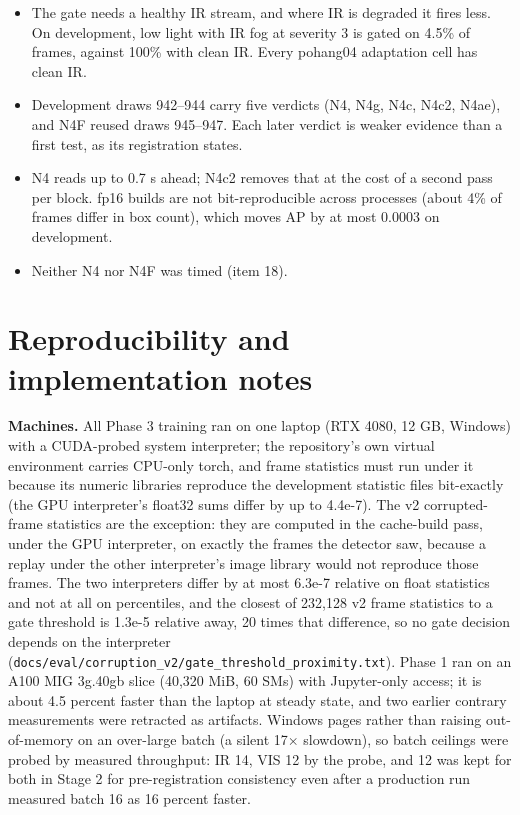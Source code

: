 \documentclass[10pt]{article}
\begin{document}
\begin{enumerate}
\begin{itemize}
\item The gate needs a healthy IR stream, and where IR is degraded it fires less. On development, low light with IR fog at severity 3 is gated on 4.5\% of frames, against 100\% with clean IR. Every pohang04 adaptation cell has clean IR.
\item Development draws 942--944 carry five verdicts (N4, N4g, N4c, N4c2, N4ae), and N4F reused draws 945--947. Each later verdict is weaker evidence than a first test, as its registration states.
\item N4 reads up to 0.7 s ahead; N4c2 removes that at the cost of a second pass per block. fp16 builds are not bit-reproducible across processes (about 4\% of frames differ in box count), which moves AP by at most 0.0003 on development.
\item Neither N4 nor N4F was timed (item 18).
\end{itemize}
\end{enumerate}

\FloatBarrier
\section{Reproducibility and implementation notes}\label{app:M}
\textbf{Machines.} All Phase 3 training ran on one laptop (RTX 4080, 12 GB, Windows) with a CUDA-probed system interpreter; the repository's own virtual environment carries CPU-only torch, and frame statistics must run under it because its numeric libraries reproduce the development statistic files bit-exactly (the GPU interpreter's float32 sums differ by up to 4.4e-7). The v2 corrupted-frame statistics are the exception: they are computed in the cache-build pass, under the GPU interpreter, on exactly the frames the detector saw, because a replay under the other interpreter's image library would not reproduce those frames. The two interpreters differ by at most 6.3e-7 relative on float statistics and not at all on percentiles, and the closest of 232,128 v2 frame statistics to a gate threshold is 1.3e-5 relative away, 20 times that difference, so no gate decision depends on the interpreter (\texttt{docs/\allowbreak{}eval/\allowbreak{}corruption\_\allowbreak{}v2/\allowbreak{}gate\_\allowbreak{}threshold\_\allowbreak{}proximity.txt}). Phase 1 ran on an A100 MIG 3g.40gb slice (40,320 MiB, 60 SMs) with Jupyter-only access; it is about 4.5 percent faster than the laptop at steady state, and two earlier contrary measurements were retracted as artifacts. Windows pages rather than raising out-of-memory on an over-large batch (a silent 17$\times$ slowdown), so batch ceilings were probed by measured throughput: IR 14, VIS 12 by the probe, and 12 was kept for both in Stage 2 for pre-registration consistency even after a production run measured batch 16 as 16 percent faster.
\end{document}
